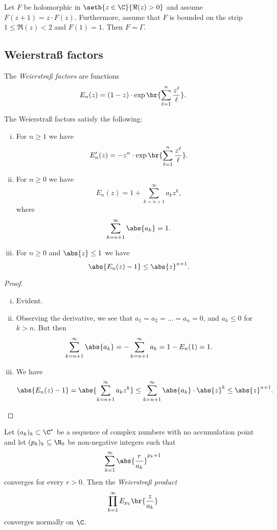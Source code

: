 \obvs

\begin{izrek}
Let $F$ be holomorphic in $\setb{z \in \C}{\Re(z) > 0}$ and assume
$F(z+1) = z \cdot F(z)$. Furthermore, assume that $F$ is bounded
on the strip $1 \leq \Re(z) < 2$ and $F(1) = 1$. Then $F = \Gamma$.
\end{izrek}

\newpage

\subsection{Weierstraß factors}


\begin{definicija}
The \emph{Weierstraß factors} are
functions
\[
E_n(z) = (1-z) \cdot \exp \br{\sum_{\ell=1}^n \frac{z^\ell}{\ell}}.
\]
\end{definicija}

\begin{lema}
The Weierstraß factors satisfy the following:

\begin{enumerate}[i)]
\item For $n \geq 1$ we have
\[
E_n'(z) = -z^n \cdot \exp \br{\sum_{\ell=1}^n \frac{z^\ell}{\ell}}.
\]
\item For $n \geq 0$ we have
\[
E_n(z) = 1 + \sum_{k=n+1}^\infty a_k z^k,
\]
where
\[
\sum_{k=n+1}^\infty \abs{a_k} = 1.
\]
\item For $n \geq 0$ and $\abs{z} \leq 1$ we have
\[
\abs{E_n(z) - 1} \leq \abs{z}^{n+1}.
\]
\end{enumerate}
\end{lema}

\begin{proof}
\phantom{i}
\begin{enumerate}[i)]
\item Evident.
\item Observing the derivative, we see that
$a_1 = a_2 = \dots = a_n = 0$, and $a_k \leq 0$ for $k > n$. But
then
\[
\sum_{k=n+1}^\infty \abs{a_k} =
-\sum_{k=n+1}^\infty a_k =
1 - E_n(1) =
1.
\]
\item We have
\[
\abs{E_n(z) - 1} =
\abs{\sum_{k=n+1}^\infty a_k z^k} \leq
\sum_{k=n+1}^\infty \abs{a_k} \cdot \abs{z}^k \leq
\abs{z}^{n+1}. \qedhere
\]
\end{enumerate}
\end{proof}

\begin{lema}
Let $(a_k)_k \subset \C^*$ be a sequence of complex numbers with no
accumulation point and let $(p_k)_k \subseteq \N_0$ be non-negative
integers such that
\[
\sum_{k=1}^\infty \abs{\frac{r}{a_k}}^{p_k+1}
\]
converges for every $r > 0$. Then the
\emph{Weierstraß product}
\[
\prod_{k=1}^\infty E_{p_k} \br{\frac{z}{a_k}}
\]
converges normally on $\C$.
\end{lema}

